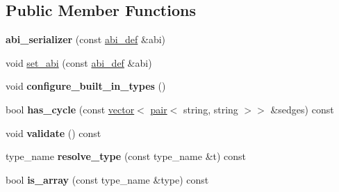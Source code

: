 \subsection*{Public Member Functions}
\begin{DoxyCompactItemize}
\item 
\mbox{\label{structaacio_1_1chain_1_1contracts_1_1abi__serializer_aee2fe07869944499d620c442ac0e6e03}} 
{\bfseries abi\+\_\+serializer} (const \mbox{\hyperlink{structaacio_1_1chain_1_1contracts_1_1abi__def}{abi\+\_\+def}} \&abi)
\item 
void \mbox{\hyperlink{structaacio_1_1chain_1_1contracts_1_1abi__serializer_a3e71b20253e6ac8f1c1eebb5584d99ed}{set\+\_\+abi}} (const \mbox{\hyperlink{structaacio_1_1chain_1_1contracts_1_1abi__def}{abi\+\_\+def}} \&abi)
\item 
\mbox{\label{structaacio_1_1chain_1_1contracts_1_1abi__serializer_a47e6a166cdc6ec0bb6f7cae67b21f590}} 
void {\bfseries configure\+\_\+built\+\_\+in\+\_\+types} ()
\item 
\mbox{\label{structaacio_1_1chain_1_1contracts_1_1abi__serializer_a243e61362203e12886f7545a8eec2570}} 
bool {\bfseries has\+\_\+cycle} (const \mbox{\hyperlink{classstd_1_1vector}{vector}}$<$ \mbox{\hyperlink{structpair}{pair}}$<$ string, string $>$$>$ \&sedges) const
\item 
\mbox{\label{structaacio_1_1chain_1_1contracts_1_1abi__serializer_a7419b8530144bf8e0de196862523b4c9}} 
void {\bfseries validate} () const
\item 
\mbox{\label{structaacio_1_1chain_1_1contracts_1_1abi__serializer_ab2e84bac5f24f7445ab664e69edf252e}} 
type\+\_\+name {\bfseries resolve\+\_\+type} (const type\+\_\+name \&t) const
\item 
\mbox{\label{structaacio_1_1chain_1_1contracts_1_1abi__serializer_ab976e12d7a3a54474e32a22ff2835675}} 
bool {\bfseries is\+\_\+array} (const type\+\_\+name \&type) const
\item 
$$
\end{DoxyCompactItemize}
